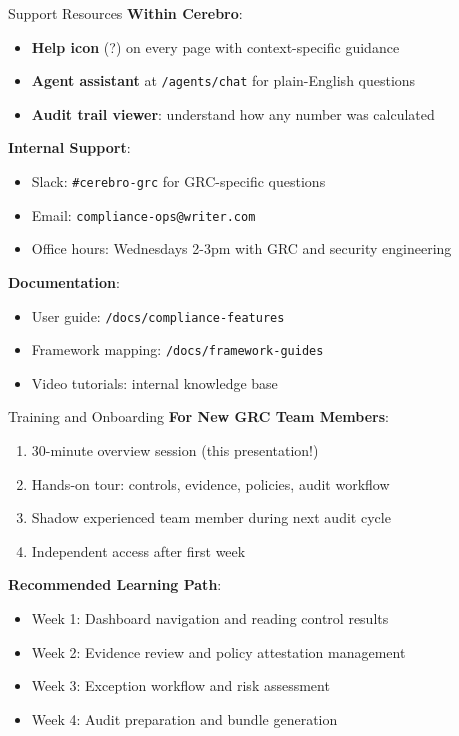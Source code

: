 \documentclass[aspectratio=169]{beamer}
\begin{document}
\begin{frame}{Support Resources}
  \textbf{Within Cerebro}:
  \begin{itemize}
    \item \textbf{Help icon} (?) on every page with context-specific guidance
    \item \textbf{Agent assistant} at \texttt{/agents/chat} for plain-English questions
    \item \textbf{Audit trail viewer}: understand how any number was calculated
  \end{itemize}
  
  \vspace{0.3cm}
  
  \textbf{Internal Support}:
  \begin{itemize}
    \item Slack: \texttt{\#cerebro-grc} for GRC-specific questions
    \item Email: \texttt{compliance-ops@writer.com}
    \item Office hours: Wednesdays 2-3pm with GRC and security engineering
  \end{itemize}
  
  \vspace{0.3cm}
  
  \textbf{Documentation}:
  \begin{itemize}
    \item User guide: \texttt{/docs/compliance-features}
    \item Framework mapping: \texttt{/docs/framework-guides}
    \item Video tutorials: internal knowledge base
  \end{itemize}
\end{frame}

\begin{frame}{Training and Onboarding}
  \textbf{For New GRC Team Members}:
  \begin{enumerate}
    \item 30-minute overview session (this presentation!)
    \item Hands-on tour: controls, evidence, policies, audit workflow
    \item Shadow experienced team member during next audit cycle
    \item Independent access after first week
  \end{enumerate}
  
  \vspace{0.3cm}
  
  \textbf{Recommended Learning Path}:
  \begin{itemize}
    \item Week 1: Dashboard navigation and reading control results
    \item Week 2: Evidence review and policy attestation management
    \item Week 3: Exception workflow and risk assessment
    \item Week 4: Audit preparation and bundle generation
  \end{itemize}
\end{frame}
\end{document}

